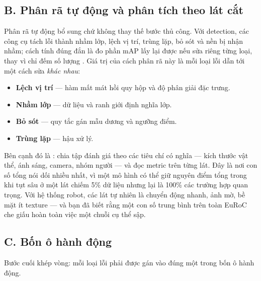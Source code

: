 \documentclass[../../deep_learning.tex]{subfiles}
\begin{document}
\subsection{B. Phân rã tự động và phân tích theo lát cắt}
Phân rã tự động bổ sung chứ không thay thế bước thủ công. Với detection, các công cụ tách lỗi thành nhầm lớp, lệch vị trí, trùng lặp, bỏ sót và nền bị nhận nhầm; cách tính đúng đắn là đo phần mAP lấy lại được nếu sửa riêng từng loại, thay vì chỉ đếm số lượng \cite{bolya2020tide,hoiem2012diagnosing}. Giá trị của cách phân rã này là mỗi loại lỗi dẫn tới một cách sửa \emph{khác nhau}:

\begin{itemize}
\item \textbf{Lệch vị trí} --- hàm mất mát hồi quy hộp và độ phân giải đặc trưng.
\item \textbf{Nhầm lớp} --- dữ liệu và ranh giới định nghĩa lớp.
\item \textbf{Bỏ sót} --- quy tắc gán mẫu dương và ngưỡng điểm.
\item \textbf{Trùng lặp} --- hậu xử lý.
\end{itemize}

Bên cạnh đó là : chia tập đánh giá theo các tiêu chí có nghĩa — kích thước vật thể, ánh sáng, camera, nhóm người — và đọc metric trên từng lát. Đây là nơi con số tổng nói dối nhiều nhất, vì một mô hình có thể giữ nguyên điểm tổng trong khi tụt sâu ở một lát chiếm 5\% dữ liệu nhưng lại là 100\% các trường hợp quan trọng. Với hệ thống robot, các lát tự nhiên là chuyển động nhanh, ảnh mờ, bề mặt ít texture — và bạn đã biết rằng một con số trung bình trên toàn EuRoC che giấu hoàn toàn việc một chuỗi cụ thể sập.

\subsection{C. Bốn ô hành động}
Bước cuối khép vòng: mỗi loại lỗi phải được gán vào đúng một trong bốn ô hành động.
\end{document}
